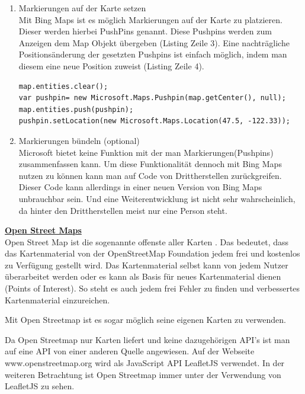 \begin{enumerate}
\item Markierungen auf der Karte setzen\\
Mit Bing Maps ist es möglich Markierungen auf der Karte zu platzieren. Dieser werden hierbei PushPins genannt. Diese Pushpins werden zum Anzeigen dem Map Objekt übergeben (Listing Zeile 3). Eine nachträgliche Positionsänderung der gesetzten Pushpins ist einfach möglich, indem man diesem eine neue Position zuweist (Listing Zeile 4).
\begin{lstlisting}
map.entities.clear(); 
var pushpin= new Microsoft.Maps.Pushpin(map.getCenter(), null); 
map.entities.push(pushpin); 
pushpin.setLocation(new Microsoft.Maps.Location(47.5, -122.33)); 
\end{lstlisting}\cite[Pushpins7]{bingmaps}

\item Markierungen bündeln (optional)\\
Microsoft bietet keine Funktion mit der man Markierungen(Pushpins) zusammenfassen kann. Um diese Funktionalität dennoch mit Bing Maps nutzen zu können kann man auf Code von Drittherstellen zurückgreifen. Dieser Code kann allerdings in einer neuen Version von Bing Maps unbrauchbar sein. Und eine Weiterentwicklung ist nicht sehr wahrscheinlich, da hinter den Drittherstellen meist nur eine Person steht. \cite[S. 92]{gruber2015}
\end{enumerate}








\textbf{\underline{Open Street Maps}}\\
Open Street Map ist die sogenannte \glqq offenste aller Karten \grqq \cite[S.92]{gruber2015}. Das bedeutet, dass das Kartenmaterial von der OpenStreetMap Foundation jedem frei und kostenlos zu Verfügung gestellt wird. Das Kartenmaterial selbst kann von jedem Nutzer überarbeitet werden oder es kann als Basis für neues Kartenmaterial dienen (Points of Interest). So steht es auch jedem frei Fehler zu finden und verbessertes Kartenmaterial einzureichen.

Mit Open Streetmap ist es sogar möglich seine eigenen Karten zu verwenden.

Da Open Streetmap nur Karten liefert und keine dazugehörigen API's ist man auf eine API von einer anderen Quelle angewiesen. Auf der Webseite www.openstreetmap.org wird als JavaScript API LeafletJS verwendet. 
In der weiteren Betrachtung ist Open Streetmap immer unter der Verwendung von LeafletJS zu sehen.


